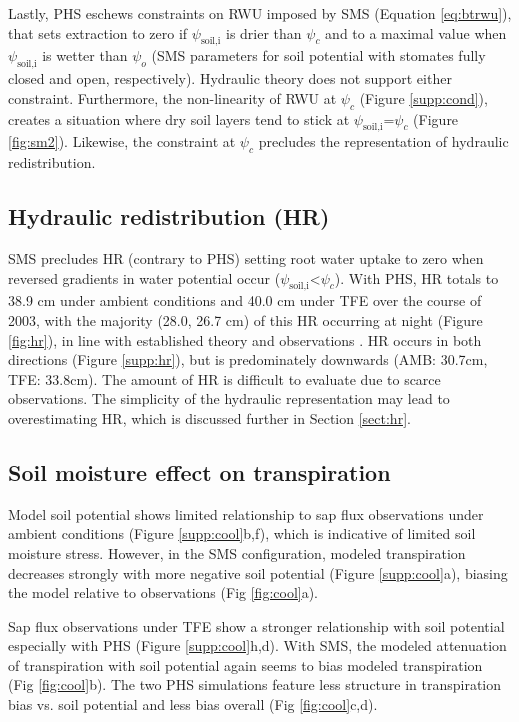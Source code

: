 \documentclass[draft,linenumbers]{agujournal}
\begin{document}
Lastly, PHS eschews constraints on RWU imposed by SMS (Equation \ref{eq:btrwu}), that sets extraction to zero if $\psi_{\text{soil,i}}$ is drier than $\psi_c$ and to a maximal value when $\psi_{\text{soil,i}}$ is wetter than $\psi_o$ (SMS parameters for soil potential with stomates fully closed and open, respectively).
Hydraulic theory does not support either constraint.
Furthermore, the non-linearity of RWU at $\psi_c$ (Figure \ref{supp:cond}), creates a situation where dry soil layers tend to stick at $\psi_{\text{soil,i}}$=$\psi_c$ (Figure \ref{fig:sm2}).
Likewise, the constraint at $\psi_c$ precludes the representation of hydraulic redistribution.

\subsection{Hydraulic redistribution (HR)}
    SMS precludes HR (contrary to PHS) setting root water uptake to zero when reversed gradients in water potential occur ($\psi_{\text{soil,i}}$<$\psi_c$).
    With PHS, HR totals to 38.9 cm under ambient conditions and 40.0 cm under TFE over the course of 2003, with the majority (28.0, 26.7 cm) of this HR occurring at night (Figure \ref{fig:hr}),
    in line with established theory \citep{jackson2000,lee2005} and observations \citep{oliveira2005,burgess1998}.
    HR occurs in both directions (Figure \ref{supp:hr}), but is predominately downwards (AMB: 30.7cm, TFE: 33.8cm).
    The amount of HR is difficult to evaluate due to scarce observations.
    The simplicity of the hydraulic representation may lead to overestimating HR, which is discussed further in Section \ref{sect:hr}.

\subsection{Soil moisture effect on transpiration}
\label{sect:smpt}
    Model soil potential shows limited relationship to sap flux observations under ambient conditions (Figure \ref{supp:cool}b,f), which is indicative of limited soil moisture stress.
    However, in the SMS configuration, modeled transpiration decreases strongly with more negative soil potential (Figure \ref{supp:cool}a),
    biasing the model relative to observations (Fig \ref{fig:cool}a).
    
    Sap flux observations under TFE show a stronger relationship with soil potential especially with PHS (Figure \ref{supp:cool}h,d).
    With SMS, the modeled attenuation of transpiration with soil potential again seems to bias modeled transpiration (Fig \ref{fig:cool}b).
    The two PHS simulations feature less structure in transpiration bias vs. soil potential and less bias overall (Fig \ref{fig:cool}c,d).
    
\end{document}
